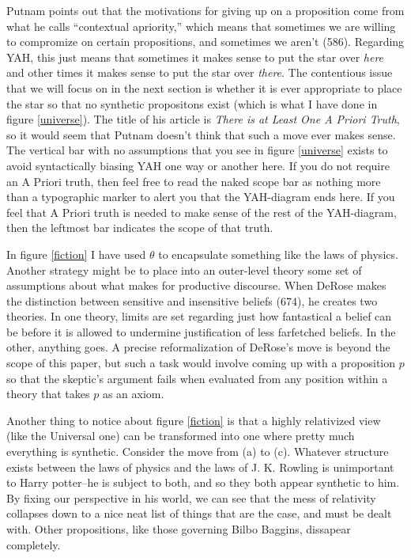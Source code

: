 \documentclass[12pt]{article}
\begin{document}
\begin{flushleft}
Putnam points out that the motivations for giving up on a proposition come from what he calls ``contextual apriority,'' which means that sometimes we are willing to compromize on certain propositions, and sometimes we aren't (586).
Regarding YAH, this just means that sometimes it makes sense to put the star over \textit{here} and other times it makes sense to put the star over \textit{there}.
The contentious issue that we will focus on in the next section is whether it is ever appropriate to place the star so that no synthetic propositons exist (which is what I have done in figure \ref{universe}).
The title of his article is \textit{There is at Least One A Priori Truth}, so it would seem that Putnam doesn't think that such a move ever makes sense.
The vertical bar with no assumptions that you see in figure \ref{universe} exists to avoid syntactically biasing YAH one way or another here.
If you do not require an A Priori truth, then feel free to read the naked scope bar as nothing more than a typographic marker to alert you that the YAH-diagram ends here.
If you feel that A Priori truth is needed to make sense of the rest of the YAH-diagram, then the leftmost bar indicates the scope of that truth.

In figure \ref{fiction} I have used $\theta$ to encapsulate something like the laws of physics.
Another strategy might be to place into an outer-level theory some set of assumptions about what makes for productive discourse.
When DeRose makes the distinction between sensitive and insensitive beliefs (674), he creates two theories.
In one theory, limits are set regarding just how fantastical a belief can be before it is allowed to undermine justification of less farfetched beliefs.
In the other, anything goes.
A precise reformalization of DeRose's move is beyond the scope of this paper, but such a task would involve coming up with a proposition $p$ so that the skeptic's argument fails when evaluated from any position within a theory that takes $p$ as an axiom.

Another thing to notice about figure \ref{fiction} is that a highly relativized view (like the Universal one) can be transformed into one where pretty much everything is synthetic.
Consider the move from (a) to (c).
Whatever structure exists between the laws of physics and the laws of J. K. Rowling is unimportant to Harry potter--he is subject to both, and so they both appear synthetic to him.
By fixing our perspective in his world, we can see that the mess of relativity collapses down to a nice neat list of things that are the case, and must be dealt with.
Other propositions, like those governing Bilbo Baggins, dissapear completely.


\end{flushleft}
\end{document}
